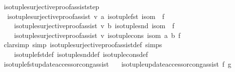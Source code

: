 \begin{isabellebody}
%
\endisadelimproof
\isanewline
{}\isamarkupfalse%
\ iso{\isacharunderscore}{\kern0pt}tuple{\isacharunderscore}{\kern0pt}surjective{\isacharunderscore}{\kern0pt}proof{\isacharunderscore}{\kern0pt}assist{\isacharunderscore}{\kern0pt}step{\isacharcolon}{\kern0pt}\isanewline
\ \ {\isachardoublequoteopen}iso{\isacharunderscore}{\kern0pt}tuple{\isacharunderscore}{\kern0pt}surjective{\isacharunderscore}{\kern0pt}proof{\isacharunderscore}{\kern0pt}assist\ v\ a\ {\isacharparenleft}{\kern0pt}iso{\isacharunderscore}{\kern0pt}tuple{\isacharunderscore}{\kern0pt}fst\ isom\ {\isasymcirc}\ f{\isacharparenright}{\kern0pt}\ {\isasymLongrightarrow}\isanewline
\ \ \ \ iso{\isacharunderscore}{\kern0pt}tuple{\isacharunderscore}{\kern0pt}surjective{\isacharunderscore}{\kern0pt}proof{\isacharunderscore}{\kern0pt}assist\ v\ b\ {\isacharparenleft}{\kern0pt}iso{\isacharunderscore}{\kern0pt}tuple{\isacharunderscore}{\kern0pt}snd\ isom\ {\isasymcirc}\ f{\isacharparenright}{\kern0pt}\ {\isasymLongrightarrow}\isanewline
\ \ \ \ iso{\isacharunderscore}{\kern0pt}tuple{\isacharunderscore}{\kern0pt}surjective{\isacharunderscore}{\kern0pt}proof{\isacharunderscore}{\kern0pt}assist\ v\ {\isacharparenleft}{\kern0pt}iso{\isacharunderscore}{\kern0pt}tuple{\isacharunderscore}{\kern0pt}cons\ isom\ a\ b{\isacharparenright}{\kern0pt}\ f{\isachardoublequoteclose}\isanewline
%
\isadelimproof
\ \ %
\endisadelimproof
%
\isatagproof
{}\isamarkupfalse%
\ {\isacharparenleft}{\kern0pt}clarsimp\ simp{\isacharcolon}{\kern0pt}\ iso{\isacharunderscore}{\kern0pt}tuple{\isacharunderscore}{\kern0pt}surjective{\isacharunderscore}{\kern0pt}proof{\isacharunderscore}{\kern0pt}assist{\isacharunderscore}{\kern0pt}def\ simps\isanewline
\ \ \ \ iso{\isacharunderscore}{\kern0pt}tuple{\isacharunderscore}{\kern0pt}fst{\isacharunderscore}{\kern0pt}def\ iso{\isacharunderscore}{\kern0pt}tuple{\isacharunderscore}{\kern0pt}snd{\isacharunderscore}{\kern0pt}def\ iso{\isacharunderscore}{\kern0pt}tuple{\isacharunderscore}{\kern0pt}cons{\isacharunderscore}{\kern0pt}def{\isacharparenright}{\kern0pt}%
\endisatagproof
{\isafoldproof}%
%
\isadelimproof
\isanewline
%
\endisadelimproof
\isanewline
{}\isamarkupfalse%
\ iso{\isacharunderscore}{\kern0pt}tuple{\isacharunderscore}{\kern0pt}fst{\isacharunderscore}{\kern0pt}update{\isacharunderscore}{\kern0pt}accessor{\isacharunderscore}{\kern0pt}cong{\isacharunderscore}{\kern0pt}assist{\isacharcolon}{\kern0pt}\isanewline
\ \ \ {\isachardoublequoteopen}iso{\isacharunderscore}{\kern0pt}tuple{\isacharunderscore}{\kern0pt}update{\isacharunderscore}{\kern0pt}accessor{\isacharunderscore}{\kern0pt}cong{\isacharunderscore}{\kern0pt}assist\ f\ g{\isachardoublequoteclose}\isanewline

\end{isabellebody}
